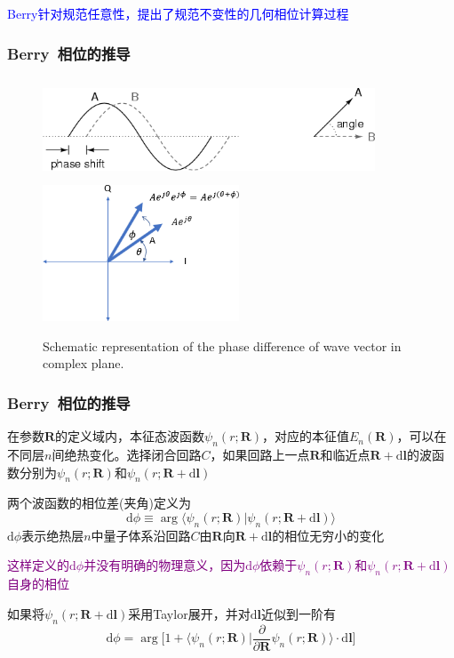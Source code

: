 {{	\textcolor{blue}{\textrm{Berry}针对规范任意性，提出了规范不变性的几何相位计算过程}
}

\frame
{
	\frametitle{\textrm{Berry~}相位的推导}
\begin{figure}[h!]
\centering
\vspace*{-0.25in}
\includegraphics[height=1.2in,width=3.9in,viewport=0 0 125 35,clip]{Figures/complex_phase-shift.png}
\includegraphics[height=1.6in,width=2.3in,viewport=0 0 360 240,clip]{Figures/complex_phase-difference.png}
\caption{\tiny \textrm{Schematic representation of the phase difference of wave vector in complex plane.}}%
\label{Complex-Phase-difference}
\end{figure} 
}

\frame
{
	\frametitle{\textrm{Berry~}相位的推导}
	在参数$\mathbf{R}$的定义域内，本征态波函数$\psi_n(r;\mathbf{R})$，对应的本征值$E_n(\mathbf{R})$，可以在不同层$n$间绝热变化。选择闭合回路$C$，如果回路上一点$\mathbf{R}$和临近点$\mathbf{R}+\mathrm{d}\mathbf{l}$的波函数分别为$\psi_n(r;\mathbf{R})$和$\psi_n(r;\mathbf{R}+\mathrm{d}\mathbf{l})$

	两个波函数的相位差(夹角)定义为
	\begin{displaymath}
		\mathrm{d}\phi\equiv\arg\langle\psi_n(r;\mathbf{R})|\psi_n(r;\mathbf{R}+\mathrm{d}\mathbf{l})\rangle
	\end{displaymath}
	$\mathrm{d}\phi$表示绝热层$n$中量子体系沿回路$C$由$\mathbf{R}$向$\mathbf{R}+\mathrm{d}\mathbf{l}$的相位无穷小的变化

	\textcolor{purple}{这样定义的$\mathrm{d}\phi$并没有明确的物理意义，因为$\mathrm{d}\phi$依赖于$\psi_n(r;\mathbf{R})$和$\psi_n(r;\mathbf{R}+\mathrm{d}\mathbf{l})$自身的相位}

	如果将$\psi_n(r;\mathbf{R}+\mathrm{d}\mathbf{l})$采用\textrm{Taylor}展开，并对$\mathrm{d}\mathbf{l}$近似到一阶有
	\begin{displaymath}
		\mathrm{d}\phi=\arg\bigg[1+\langle\psi_n(r;\mathbf{R})|\dfrac{\partial}{\partial\mathbf{R}}\psi_n(r;\mathbf{R})\rangle\cdot\mathrm{d}\mathbf{l}\bigg]
	\end{displaymath}
}

}
